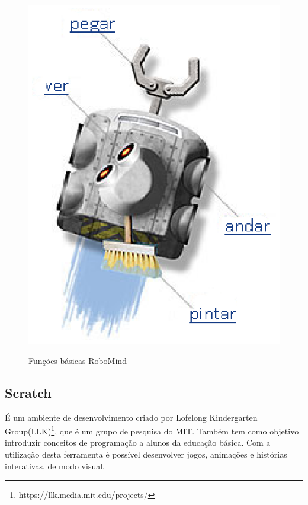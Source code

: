 		\begin{figure}[H]
			\centering
			\caption{Funções básicas RoboMind}
			\includegraphics[scale=0.8]{figuras/funcoesBasicasRoboMind.eps}
			\label{img:funcoesBasicasRoboMind}
		\end{figure}
	

	\subsection{Scratch} %
	\label{sub:scratch}

		É um ambiente de desenvolvimento criado por Lofelong Kindergarten Group(LLK)\footnote{https://llk.media.mit.edu/projects/}, que é um grupo de pesquisa do MIT. Também tem como objetivo introduzir conceitos de programação a alunos da educação básica. Com a utilização desta ferramenta é possível desenvolver jogos, animações e histórias interativas, de modo visual.


